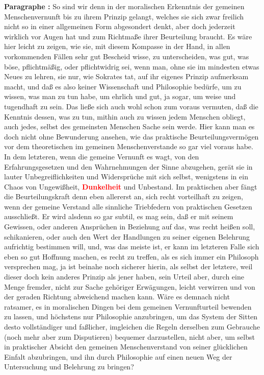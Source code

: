 \documentclass[a4paper,12pt,twoside]{book}
\newcommand{\match}[1]{\textcolor{red}{\textbf{#1}}}
\begin{document}
	\textbf{Paragraphe : }So sind wir denn in der moralischen Erkenntnis der gemeinen Menschenvernunft bis zu ihrem Prinzip gelangt, welches sie sich zwar freilich nicht so in einer allgemeinen  Form abgesondert denkt, aber doch jederzeit wirklich vor Augen hat und zum Richtmaße ihrer Beurteilung braucht. Es wäre hier leicht zu zeigen, wie sie, mit diesem Kompasse in der Hand, in allen vorkommenden Fällen sehr gut Bescheid wisse, zu unterscheiden, was gut, was böse, pflichtmäßig, oder pflichtwidrig sei, wenn man, ohne sie im mindesten etwas Neues zu lehren, sie nur, wie Sokrates tat, auf ihr eigenes Prinzip aufmerksam macht, und daß es also keiner Wissenschaft und Philosophie bedürfe, um zu wissen, was man zu tun habe, um ehrlich und gut, ja sogar, um weise und tugendhaft zu sein. Das ließe sich auch wohl schon zum voraus vermuten, daß die Kenntnis dessen, was zu tun, mithin auch zu wissen jedem Menschen obliegt, auch jedes, selbst des gemeinsten Menschen Sache sein werde. Hier kann man es doch nicht ohne Bewunderung ansehen, wie das praktische Beurteilungsvermögen vor dem theoretischen im gemeinen Menschenverstande so gar viel voraus habe. In dem letzteren, wenn die gemeine Vernunft es wagt, von den Erfahrungsgesetzen und den Wahrnehmungen der Sinne abzugehen, gerät sie in lauter Unbegreiflichkeiten und Widersprüche mit sich selbst, wenigstens in ein Chaos von Ungewißheit, \match{Dunkelheit} und Unbestand. Im praktischen aber fängt die Beurteilungskraft denn eben allererst an, sich recht vorteilhaft zu zeigen, wenn der gemeine Verstand alle sinnliche Triebfedern von praktischen Gesetzen ausschließt. Er wird alsdenn so gar subtil, es mag sein, daß er mit seinem Gewissen, oder anderen Ansprüchen in Beziehung auf das, was recht heißen soll, schikanieren, oder auch den Wert der Handlungen zu seiner eigenen Belehrung aufrichtig bestimmen will, und, was das meiste ist, er kann im letzteren Falle sich eben so gut Hoffnung machen, es recht zu treffen, als es sich immer ein Philosoph versprechen mag, ja ist beinahe noch sicherer hierin, als selbst der letztere, weil dieser doch kein anderes Prinzip als jener haben, sein Urteil aber, durch eine Menge fremder, nicht zur Sache gehöriger Erwägungen, leicht verwirren und von der geraden Richtung abweichend machen kann. Wäre es demnach nicht ratsamer,  es in moralischen Dingen bei dem gemeinen Vernunfturteil bewenden zu lassen, und höchstens nur Philosophie anzubringen, um das System der Sitten desto vollständiger und faßlicher, imgleichen die Regeln derselben zum Gebrauche (noch mehr aber zum Disputieren) bequemer darzustellen, nicht aber, um selbst in praktischer Absicht den gemeinen Menschenverstand von seiner glücklichen Einfalt abzubringen, und ihn durch Philosophie auf einen neuen Weg der Untersuchung und Belehrung zu bringen? 
	
\end{document}
